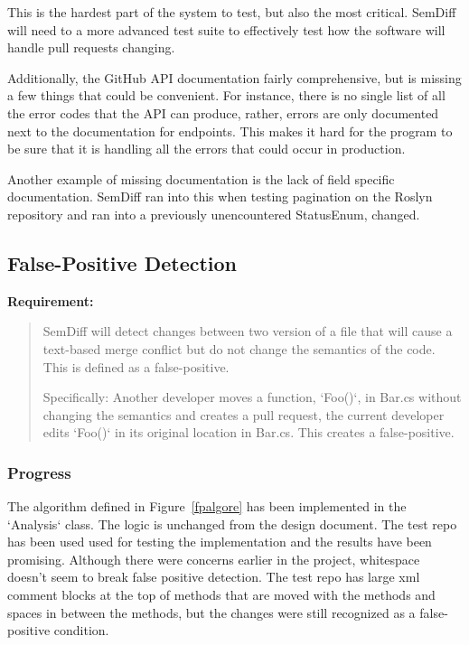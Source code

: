 \documentclass[draftclsnofoot,onecolumn]{IEEEtran}
\begin{document}
This is the hardest part of the system to test, but also the most critical. 
SemDiff will need to a more advanced test suite to effectively test how the 
software will handle pull requests changing.

Additionally, the GitHub API documentation fairly comprehensive, but is missing 
a few things that could be convenient. For instance, there is no single list of 
all the error codes that the API can produce, rather, errors are only 
documented next to the documentation for endpoints. This makes it hard for the 
program to be sure that it is handling all the errors that could occur in 
production.

Another example of missing documentation is the lack of field specific 
documentation. SemDiff ran into this when testing pagination on the Roslyn 
repository and ran into a previously unencountered StatusEnum, changed. 

\subsection{False-Positive Detection}%

\textbf{Requirement:}

\begin{quote}

SemDiff will detect changes between two version of a file that will cause a 
text-based merge conflict but do not change the semantics of the code. This is 
defined as a false-positive. 

Specifically: Another developer moves a function, `Foo()`, in Bar.cs without 
changing the semantics and creates a pull request, the current developer edits 
`Foo()` in its original location in Bar.cs. This creates a false-positive.

\end{quote}

\subsubsection{Progress}

The algorithm defined in Figure~\ref{fpalgore} has been implemented in the 
`Analysis` class. The logic is unchanged from the design document. The test 
repo has been used used for testing the implementation and the results have 
been promising. Although there were concerns earlier in the project, whitespace 
doesn’t seem to break false positive detection. The test repo has large xml 
comment blocks at the top of methods that are moved with the methods and spaces 
in between the methods, but the changes were still recognized as a 
false-positive condition.
\end{document}
